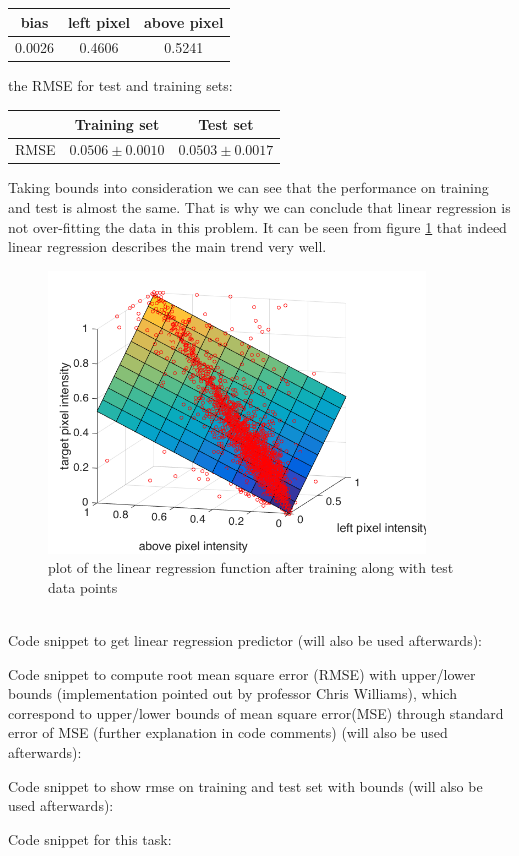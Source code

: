 \documentclass{article}
\begin{document}
\begin{enumerate}[label=(\alph*)]
\begin{center}
						\begin{tabular}{| c | c | c |}
							\hline
							bias & left pixel & above pixel \\ \hline
							0.0026  & 0.4606 & 0.5241 \\ 
							\hline
						\end{tabular}
					\end{center}					
					the RMSE for test and training sets:
					\begin{center}
						\begin{tabular}{| c | c | c |}
							\hline
							\, & Training set & Test set \\ \hline
							RMSE  & $0.0506 \pm 0.0010$ & $0.0503 \pm 0.0017$ \\ 
							\hline
						\end{tabular}
					\end{center}
					Taking bounds into consideration we can see that the performance on training and test is almost the same. That is why we can conclude that linear regression is not over-fitting the data in this problem. It can be seen from figure \ref{fig:p1-2-c} that indeed linear regression describes the main trend very well. \\
				 	\begin{figure}[htbp]
				 		\centering
				 		\includegraphics[width=10cm]{images/p1-2-c}
				 		\caption{plot of the linear regression function after training along with test data points}
				 		\label{fig:p1-2-c}
				 	\end{figure}
				 	\\
					Code snippet to get linear regression predictor (will also be used afterwards):
					 
					Code snippet to compute root mean square error (RMSE) with upper/lower bounds (implementation pointed out by professor Chris Williams), which correspond to upper/lower bounds of mean square error(MSE) through standard error of MSE (further explanation in code comments)  (will also be used  afterwards):
					
					Code snippet to show rmse on training and test set with bounds (will also be used  afterwards):
					
					Code snippet for this task:
					
			\end{enumerate}
\end{document}
